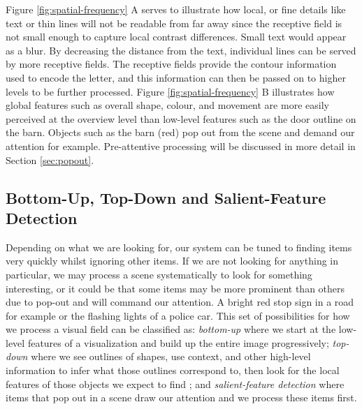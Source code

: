 Figure \ref{fig:spatial-frequency} A serves to illustrate how local, or fine details like text or thin lines will not be readable from far away since the receptive field is not small enough to capture local contrast differences. 
Small text would appear as a blur. 
By decreasing the distance from the text, individual lines can be served by more receptive fields. 
The receptive fields provide the contour information used to encode the letter, and this information can then be passed on to higher levels to be further processed. 
Figure \ref{fig:spatial-frequency} B illustrates how global features such as overall shape, colour, and movement are more easily perceived at the overview level than low-level features such as the door outline on the barn. 
Objects such as the barn (red) pop out from the scene and demand our attention for example. 
Pre-attentive processing will be discussed in more detail in Section \ref{sec:popout}.


\subsection{Bottom-Up, Top-Down and Salient-Feature Detection}
\label{sec:topdown_bottomup}

Depending on what we are looking for, our system can be tuned to finding items very quickly whilst ignoring other items. 
If we are not looking for anything in particular, we may process a scene systematically to look for something interesting, or it could be that some items may be more prominent than others due to pop-out and will command our attention. 
A bright red stop sign in a road for example or the flashing lights of a police car. 
This set of possibilities for how we process a visual field can be classified as: 
\emph{bottom-up} where we start at the low-level features of a visualization and build up the entire image progressively\cite{marrvision}; 
\emph{top-down} where we see outlines of shapes, use context, and other high-level information to infer what those outlines correspond to, then look for the local features of those objects we expect to find \cite{lee2003computations}; and 
\emph{salient-feature detection} where items that pop out in a scene draw our attention and we process these items first. 

